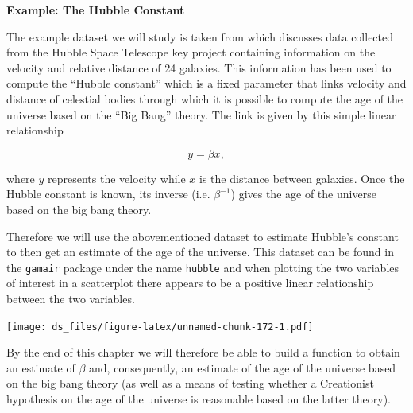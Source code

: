 \documentclass[12pt,]{krantz}
\newenvironment{Shaded}{\begin{snugshade}}{\end{snugshade}}
\newcommand{\KeywordTok}[1]{\textcolor[rgb]{0.27,0.27,0.27}{\textbf{#1}}}
\newcommand{\DataTypeTok}[1]{\textcolor[rgb]{0.27,0.27,0.27}{#1}}
\newcommand{\DecValTok}[1]{\textcolor[rgb]{0.06,0.06,0.06}{#1}}
\newcommand{\StringTok}[1]{\textcolor[rgb]{0.5,0.5,0.5}{#1}}
\newcommand{\CommentTok}[1]{\textcolor[rgb]{0.37,0.37,0.37}{\textit{#1}}}
\newcommand{\OperatorTok}[1]{\textcolor[rgb]{0.43,0.43,0.43}{\textbf{#1}}}
\newcommand{\NormalTok}[1]{#1}
\begin{document}
\textbf{Example: The Hubble Constant}

The example dataset we will study is taken from
\citet{wood2017generalized} which discusses data collected from the
Hubble Space Telescope key project containing information on the
velocity and relative distance of 24 galaxies. This information has been
used to compute the ``Hubble constant'' which is a fixed parameter that
links velocity and distance of celestial bodies through which it is
possible to compute the age of the universe based on the ``Big Bang''
theory. The link is given by this simple linear relationship

\begin{equation*}
  y = \beta x ,
\end{equation*}

where \(y\) represents the velocity while \(x\) is the distance between
galaxies. Once the Hubble constant is known, its inverse (i.e.
\(\beta^{-1}\)) gives the age of the universe based on the big bang
theory.

Therefore we will use the abovementioned dataset to estimate Hubble's
constant to then get an estimate of the age of the universe. This
dataset can be found in the \texttt{gamair} package under the name
\texttt{hubble} and when plotting the two variables of interest in a
scatterplot there appears to be a positive linear relationship between
the two variables.

\begin{Shaded}
\end{Shaded}

\texttt{[image: ds\_files/figure-latex/unnamed-chunk-172-1.pdf]}

By the end of this chapter we will therefore be able to build a function
to obtain an estimate of \(\beta\) and, consequently, an estimate of the
age of the universe based on the big bang theory (as well as a means of
testing whether a Creationist hypothesis on the age of the universe is
reasonable based on the latter theory).
\end{document}
